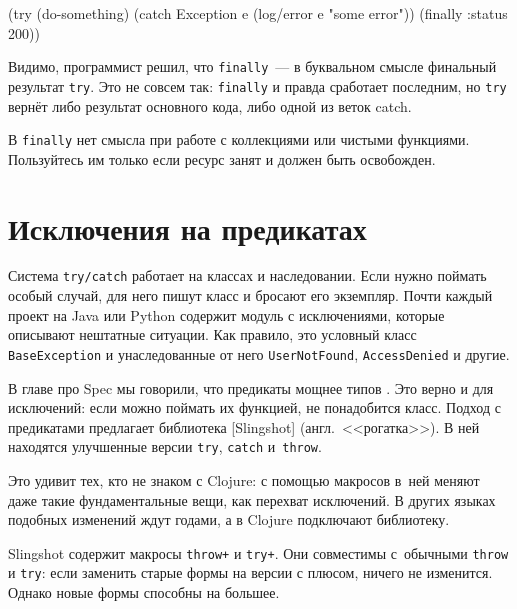 \begin{english}
  \begin{clojure}
(try
  (do-something)
  (catch Exception e
    (log/error e "some error"))
  (finally
    {:status 200}))
  \end{clojure}
\end{english}

Видимо, программист решил, что \verb|finally|~--- в буквальном смысле финальный
результат \verb|try|. Это не совсем так: \verb|finally| и правда сработает
последним, но \verb|try| вернёт либо результат основного кода, либо одной из
веток catch.

В \verb|finally| нет смысла при работе с коллекциями или чистыми
функциями. Пользуйтесь им только если ресурс занят и должен быть освобожден.

\section{Исключения на предикатах}


Система \verb|try/catch| работает на классах и наследовании. Если нужно поймать
особый случай, для него пишут класс и бросают его экземпляр. Почти каждый проект
на Java или Python содержит модуль с исключениями, которые описывают нештатные
ситуации. Как правило, это условный класс \verb|BaseException| и унаследованные
от него \verb|UserNotFound|, \verb|AccessDenied| и другие.


В главе про Spec мы говорили, что предикаты мощнее типов
. Это верно и для исключений: если можно поймать их
функцией, не понадобится класс. Подход с предикатами предлагает библиотека
[Slingshot] (англ.~<<рогатка>>).
В ней находятся улучшенные версии \verb|try|, \verb|catch| и~\verb|throw|.


Это удивит тех, кто не знаком с Clojure: с помощью макросов в~ней меняют даже
такие фундаментальные вещи, как перехват исключений. В других языках подобных
изменений ждут годами, а в Clojure подключают библиотеку.


Slingshot содержит макросы \verb|throw+| и \verb|try+|. Они совместимы
с~обычными \verb|throw| и \verb|try|: если заменить старые формы на версии с
плюсом, ничего не изменится. Однако новые формы способны на большее.

